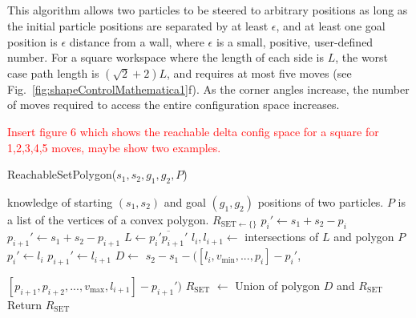 \subsection{}
 This algorithm allows two particles to be steered to arbitrary positions as long as the initial particle positions are separated by at least $\epsilon$, and at least one goal position is $\epsilon$ distance from a wall, where $\epsilon$ is a small, positive, user-defined number. 
For a square workspace where the length of each side is $L$, the worst case path length is $(\sqrt{2}+2)L$, and requires at most five moves (see Fig.~\ref{fig:shapeControlMathematica1}f).
As the corner angles increase, the number of moves required to access the entire configuration space increases.  

\textcolor{red}{Insert figure 6 which shows the reachable delta config space for a square for 1,2,3,4,5 moves, maybe show two examples.}

% 
 \begin{algorithm}[htb]
\caption{ { \sc ReachableSetPolygon}($s_1,s_2,g_1,g_2, P$)}\label{alg:polygonReachbale}
\begin{algorithmic}[1]
\Require knowledge of starting $(s_1,s_2)$ and goal $(g_1,g_2)$ positions of  two particles. 
$P$ is a list of the vertices of a convex polygon. %
\State $R_{\textrm{SET}\gets \{\}}$
\State $p_{i}' \gets s_1 + s_2 - p_i$
\State $p_{i+1}' \gets s_1 + s_2 - p_{i+1}$
\State $L \gets \overline{ p_i' p_{i+1}'}$ 
\State $l_i, l_{i+1} \gets $ intersections of $L$ and polygon $P$
\State $p_{i}' \gets l_i$
\EndIf
{}
\State $p_{i+1}' \gets l_{i+1}$
\EndIf
\State $D \gets$ $s_2 - s_1 -([l_i, v_{\textrm{min}}, ..., p_i ] -p_i' $,

$[p_{i+1} , p_{i+2}, ... , v_{\textrm{max}}, l_{i+1}] - p_{i+1}')$
\State $R_{\textrm{SET}}$ $\gets$ Union of polygon $D$ and $R_{\textrm{SET}}$
\EndFor
\State Return $R_{\textrm{SET}}$
\end{algorithmic}
\end{algorithm}



